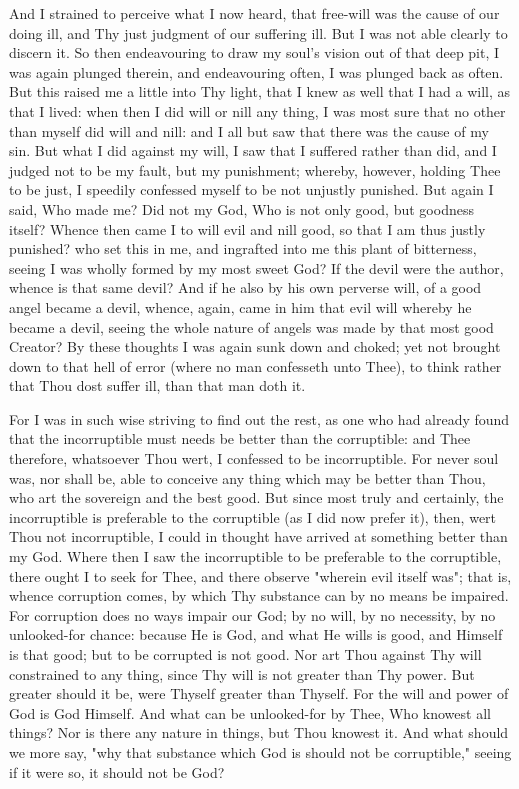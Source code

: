 \documentclass[b5paper,openright,12pt,twoside]{book}
\begin{document}
And I strained to perceive what I now heard, that free-will was the
cause of our doing ill, and Thy just judgment of our suffering ill. But
I was not able clearly to discern it. So then endeavouring to draw my
soul's vision out of that deep pit, I was again plunged therein, and
endeavouring often, I was plunged back as often. But this raised me a
little into Thy light, that I knew as well that I had a will, as that I
lived: when then I did will or nill any thing, I was most sure that no
other than myself did will and nill: and I all but saw that there
was the cause of my sin. But what I did against my will, I saw that
I suffered rather than did, and I judged not to be my fault, but my
punishment; whereby, however, holding Thee to be just, I speedily
confessed myself to be not unjustly punished. But again I said, Who made
me? Did not my God, Who is not only good, but goodness itself? Whence
then came I to will evil and nill good, so that I am thus justly
punished? who set this in me, and ingrafted into me this plant of
bitterness, seeing I was wholly formed by my most sweet God? If the
devil were the author, whence is that same devil? And if he also by his
own perverse will, of a good angel became a devil, whence, again, came
in him that evil will whereby he became a devil, seeing the whole nature
of angels was made by that most good Creator? By these thoughts I was
again sunk down and choked; yet not brought down to that hell of error
(where no man confesseth unto Thee), to think rather that Thou dost
suffer ill, than that man doth it.

For I was in such wise striving to find out the rest, as one who had
already found that the incorruptible must needs be better than the
corruptible: and Thee therefore, whatsoever Thou wert, I confessed to
be incorruptible. For never soul was, nor shall be, able to conceive any
thing which may be better than Thou, who art the sovereign and the
best good. But since most truly and certainly, the incorruptible is
preferable to the corruptible (as I did now prefer it), then, wert Thou
not incorruptible, I could in thought have arrived at something better
than my God. Where then I saw the incorruptible to be preferable to the
corruptible, there ought I to seek for Thee, and there observe "wherein
evil itself was"; that is, whence corruption comes, by which Thy
substance can by no means be impaired. For corruption does no ways
impair our God; by no will, by no necessity, by no unlooked-for chance:
because He is God, and what He wills is good, and Himself is that
good; but to be corrupted is not good. Nor art Thou against Thy will
constrained to any thing, since Thy will is not greater than Thy power.
But greater should it be, were Thyself greater than Thyself. For the
will and power of God is God Himself. And what can be unlooked-for by
Thee, Who knowest all things? Nor is there any nature in things, but
Thou knowest it. And what should we more say, "why that substance which
God is should not be corruptible," seeing if it were so, it should not
be God?
\end{document}
